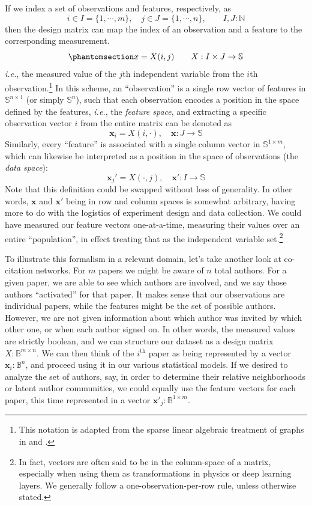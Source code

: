 \documentclass[%
	12pt,
		oneside,
		letterpaper
]{book}
\begin{document}
If we index a set of observations and features, respectively, as
\[ i\in I=\{1,\cdots,m\}, \quad j\in J=\{1,\cdots,n\},\qquad I,J:\mathbb{N}\]
then the design matrix can map the index of an observation and a feature to the corresponding measurement.
\begin{equation}\phantomsection\label{eq-design-mat}{
x=X(i,j)\qquad X : I\times J \rightarrow \mathbb{S}
}\end{equation}
\emph{i.e.}, the measured value of the \(j\)th independent variable from the \(i\)th observation.\footnote{
  This notation is adapted from the sparse linear algebraic treatment of graphs in \textcite{GraphAlgorithmsLanguage_Kepner2011} and \textcite{MathematicalfoundationsGraphBLAS_Kepner2016}.}
In this scheme, an ``observation'' is a single row vector of features in \(\mathbb{S}^{n\times 1}\) (or simply \(\mathbb{S}^{n}\)), such that each observation encodes a position in the space defined by the features, \emph{i.e.}, the \emph{feature space}, and extracting a specific observation vector \(i\) from the entire matrix can be denoted as
\[\mathbf{x}_i=X(i,\cdot),\quad \mathbf{x}:J\rightarrow\mathbb{S}\]
Similarly, every ``feature'' is associated with a single column vector in \(\mathbb{S}^{1\times m}\), which can likewise be interpreted as a position in the space of observations (the \emph{data space}):
\[\mathbf{x}_j'=X(\cdot,j),\quad \mathbf{x}':I\rightarrow\mathbb{S}\]
Note that this definition could be swapped without loss of generality.
In other words, \(\mathbf{x}\) and \(\mathbf{x}'\) being in row and column spaces is somewhat arbitrary, having more to do with the logistics of experiment design and data collection.
We could have measured our feature vectors one-at-a-time, measuring their values over an entire ``population'', in effect treating that as the independent variable set.\footnote{
  In fact, vectors are often said to be in the column-space of a matrix, especially when using them as transformations in physics or deep learning layers.
  We generally follow a one-observation-per-row rule, unless otherwise stated.}

To illustrate this formalism in a relevant domain, let's take another look at co-citation networks.
For \(m\) papers we might be aware of \(n\) total authors.
For a given paper, we are able to see which authors are involved, and we say those authors ``activated'' for that paper.
It makes sense that our observations are individual papers, while the features might be the set of possible authors.
However, we are not given information about which author was invited by which other one, or when each author signed on.
In other words, the measured values are strictly boolean, and we can structure our dataset as a design matrix \(X:\mathbb{B}^{m\times n}\).
We can then think of the \(i^{\mathrm{th}}\) paper as being represented by a vector \(\mathbf{x}_i:\mathbb{B}^n\), and proceed using it in our various statistical models.
If we desired to analyze the set of authors, say, in order to determine their relative neighborhoods or latent author communities, we could equally use the feature vectors for each paper, this time represented in a vector \(\mathbf{x}'_j:\mathbb{B}^{1\times m}\).
\end{document}
